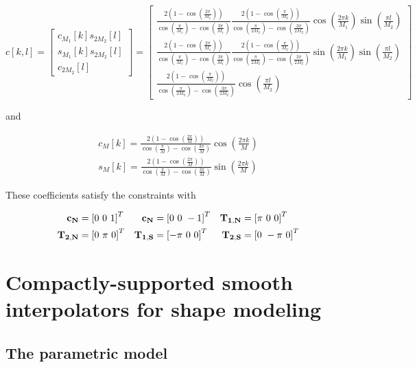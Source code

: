 \documentclass[a4paper, 11pt]{article}
\begin{document}
\begin{equation}
  \boxed{c[k, l] = \begin{bmatrix} c_{M_1}[k]s_{2M_2}[l] \\ s_{M_1}[k]s_{2M_2}[l] \\ c_{2M_2}[l] \end{bmatrix} = 
    \begin{bmatrix} \frac{2(1-\cos(\frac{2\pi}{M_1}))}{\cos (\frac{\pi}{M_1})-\cos (\frac{3\pi}{M_1})}  
      \frac{2(1-\cos(\frac{\pi}{M_2}))}{\cos (\frac{\pi}{2M_2})-\cos (\frac{3\pi}{2M_2})} \cos (\frac{2\pi k}{M_1}) \sin 
      (\frac{\pi l}{M_2}) \\ \frac{2(1-\cos(\frac{2\pi}{M_1}))}{\cos (\frac{\pi}{M_1})-\cos (\frac{3\pi}{M_1})}  
      \frac{2(1-\cos(\frac{\pi}{M_2}))}{\cos (\frac{\pi}{2M_2})-\cos (\frac{3\pi}{2M_2})} \sin (\frac{2\pi k}{M_1}) \sin 
      (\frac{\pi l}{M_2}) \\
    \frac{2(1-\cos(\frac{\pi}{M_2}))}{\cos (\frac{\pi}{2M_2})-\cos (\frac{3\pi}{2M_2})} \cos (\frac{\pi l}{M_2}) 
\end{bmatrix}}
\end{equation}

and

\begin{align*}
  c_M[k] = \frac{2(1-\cos(\frac{2\pi}{M}))}{\cos (\frac{\pi}{M})-\cos (\frac{3\pi}{M})} \cos (\frac{2\pi k}{M}) \\
  s_M[k] = \frac{2(1-\cos(\frac{2\pi}{M}))}{\cos (\frac{\pi}{M})-\cos (\frac{3\pi}{M})} \sin (\frac{2\pi k}{M}) 
\end{align*}

These coefficients satisfy the constraints with 

\begin{align*}
{\bf c_N} &= {[0 \ 0 \ 1]}^T & {\bf c_N} &= {[0 \ 0 \ -1]}^T &  {\bf T_{1, N}} &= {[\pi \ 0 \ 0]}^T \\
{\bf T_{2,N}} &= {[0 \ \pi \ 0]}^T & {\bf T_{1, S}} &= {[-\pi \ 0 \ 0]}^T & {\bf T_{2,S}} &= {[0 \ -\pi \ 0]}^T
\end{align*}

\clearpage

\section{Compactly-supported smooth interpolators for shape modeling}

\subsection{The parametric model}
\end{document}
